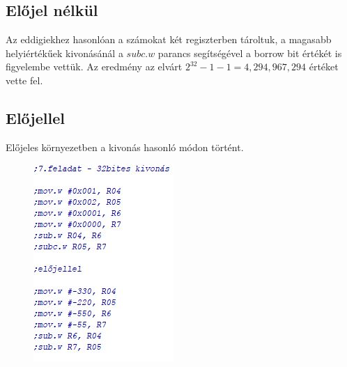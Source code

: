 \documentclass[10pt, conference,a4paper]{ITKproc}
\begin{document}
\subsection{Előjel nélkül}
Az eddigiekhez hasonlóan a számokat két regiszterben tároltuk, a magasabb helyiértékűek kivonásánál a $subc.w$ parancs segítségével a borrow bit értékét is figyelembe vettük. Az eredmény az elvárt $2^32 - 1 - 1 = 4,294,967,294$ értéket vette fel. 
\subsection{Előjellel}
Előjeles környezetben a kivonás hasonló módon történt. 

\begin{figure}[h]
\includegraphics[scale=0.5]{7feladat}
\centering

\end{figure}










%


\end{document}

